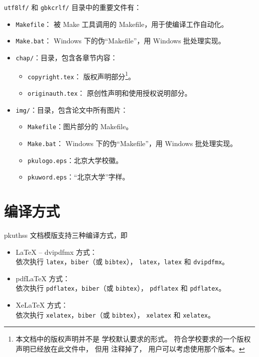 	\verb|utf8lf/| 和 \verb|gbkcrlf/| 目录中的重要文件有：
	\begin{itemize}
		\item \verb|Makefile|：
			被 Make 工具调用的 Makefile，用于使编译工作自动化。
		\item \verb|Make.bat|：%
			Windows 下的伪“Makefile”，用 Windows 批处理实现。
		\item \verb|chap/|：目录，包含各章节内容：
		\begin{itemize}
			\item \verb|copyright.tex|：
				版权声明部分\footnote{%
					本文档中的版权声明并不是%
					学校默认要求的形式\supercite{pku-copyright}。
					符合学校要求的一个版权声明已经放在此文件中，
					但用 \texttt{\string\iffalse{} ...\ \string\fi} %
					注释掉了，
					用户可以考虑使用那个版本。
				}。
			\item \verb|originauth.tex|：
				原创性声明和使用授权说明部分\supercite{pku-originauth}。
		\end{itemize}
		\item \verb|img/|：目录，包含论文中所有图片：
		\begin{itemize}
			\item \verb|Makefile|：图片部分的 Makefile。
			\item \verb|Make.bat|：%
				Windows 下的伪“Makefile”，用 Windows 批处理实现。
			\item \verb|pkulogo.eps|：北京大学校徽。
			\item \verb|pkuword.eps|：“北京大学”字样。
		\end{itemize}
	\end{itemize}

	\section{编译方式}\label{sec:compile}

	pkuthss 文档模版支持三种编译方式，即
	\begin{itemize}
		\item \LaTeX{} -- dvipdfmx 方式：\\
			依次执行 \verb|latex|，\verb|biber|（或 \verb|bibtex|），%
			\verb|latex|，\verb|latex| 和 \verb|dvipdfmx|。
		\item pdf\LaTeX{} 方式：\\
			依次执行 \verb|pdflatex|，\verb|biber|（或 \verb|bibtex|），%
			\verb|pdflatex| 和 \verb|pdflatex|。
		\item Xe\LaTeX{} 方式：\\
			依次执行 \verb|xelatex|，\verb|biber|（或 \verb|bibtex|），%
			\verb|xelatex| 和 \verb|xelatex|。\\
	\end{itemize}


